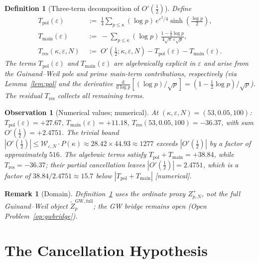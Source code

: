 \documentclass[11pt]{article}
\newtheorem{definition}[theorem]{Definition}
\newtheorem{observation}[theorem]{Observation}
\newtheorem*{remark}{Remark}
\newcommand{\Wgamma}{\mathcal{W}_{\varepsilon,N}}   %
\begin{document}
\begin{definition}[Three-term decomposition of $O'(\tfrac12)$]
\label{def:threeterm}
Define
\begin{align*}
T_{\mathrm{pol}}(\varepsilon) &\;:=\;
  \tfrac14\sum_{p\le\kappa}(\log p)\,e^{\varepsilon^2/4}
  \sinh\!\left(\tfrac{\log p}{2}\right), \\[4pt]
T_{\mathrm{main}}(\varepsilon) &\;:=\;
  -\sum_{p\le\kappa}(\log p)\,
  \frac{1-\tfrac12\log p}{4\sqrt{\pi}\,\varepsilon\sqrt{p}}, \\[4pt]
T_{\mathrm{res}}(\kappa,\varepsilon,N) &\;:=\;
  O'\!\left(\tfrac12;\kappa,\varepsilon,N\right)
  - T_{\mathrm{pol}}(\varepsilon) - T_{\mathrm{main}}(\varepsilon).
\end{align*}
The terms $T_{\mathrm{pol}}(\varepsilon)$ and $T_{\mathrm{main}}(\varepsilon)$ are
algebraically explicit in $\varepsilon$ and arise from the Guinand--Weil
pole and prime main-term contributions, respectively
(via Lemma~\ref{lem:pol} and the derivative
$\tfrac{\mathrm{d}}{\mathrm{d}\log p}[(\log p)/\sqrt{p}]
=(1-\tfrac12\log p)/\sqrt{p}$).
The residual $T_{\mathrm{res}}$ collects all remaining terms.
\end{definition}

\begin{observation}[Numerical values; numerical]
\label{obs:threeterm}
At $(\kappa,\varepsilon,N)=(53,0.05,100)$:
$T_{\mathrm{pol}}(\varepsilon)=+27.67$,
$T_{\mathrm{main}}(\varepsilon)=+11.18$,
$T_{\mathrm{res}}(53,0.05,100)=-36.37$,
with sum $O'(\tfrac12)=+2.4751$.
The trivial bound
$|O'(\tfrac12)|\le\Wgamma\cdot P(\kappa)\approx 28.42\times 44.93\approx 1277$
exceeds $|O'(\tfrac12)|$ by a factor of approximately $516$.
The algebraic terms satisfy $T_{\mathrm{pol}}+T_{\mathrm{main}}=+38.84$,
while $T_{\mathrm{res}}=-36.37$;
their partial cancellation leaves $|O'(\tfrac12)|=2.4751$, which is
a factor of $38.84/2.4751\approx 15.7$ below $|T_{\mathrm{pol}}+T_{\mathrm{main}}|$ [numerical].
\end{observation}

\begin{remark}[Domain]
Definition~\ref{def:threeterm} uses the ordinate proxy $Z_{p,N}^+$,
not the full Guinand--Weil object $\widetilde Z_p^{\mathrm{GW,full}}$;
the GW bridge remains open (Open Problem~\ref{op:gwbridge}).
\end{remark}

\section{The Cancellation Hypothesis}
\label{sec:cancel}
\end{document}
